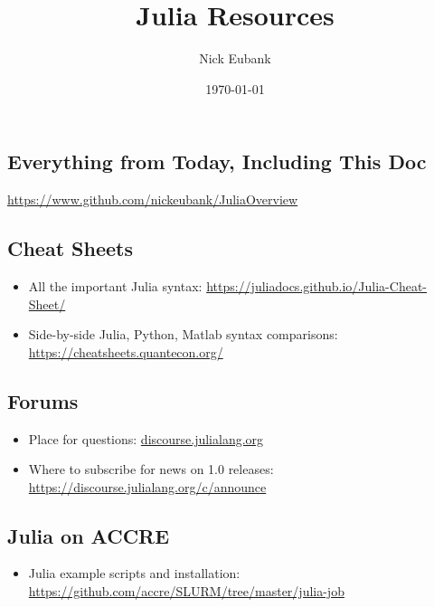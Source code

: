\documentclass[12pt]{article}
\title{Julia Resources}
\author{Nick Eubank}
\date{\today}
\begin{document}
\maketitle

\subsection*{Everything from Today, Including This Doc}
\url{https://www.github.com/nickeubank/JuliaOverview}


\subsection*{Cheat Sheets}
\begin{itemize}
    \item All the important Julia syntax: \url{https://juliadocs.github.io/Julia-Cheat-Sheet/}
    \item Side-by-side Julia, Python, Matlab syntax comparisons: \url{https://cheatsheets.quantecon.org/}
\end{itemize}

\subsection*{Forums}
\begin{itemize}
    \item Place for questions: \url{discourse.julialang.org}
    \item Where to subscribe for news on 1.0 releases: \url{https://discourse.julialang.org/c/announce}
\end{itemize}


\subsection*{Julia on ACCRE}
\begin{itemize}
    \item Julia example scripts and installation: \url{https://github.com/accre/SLURM/tree/master/julia-job}
\end{itemize}
\end{document}
